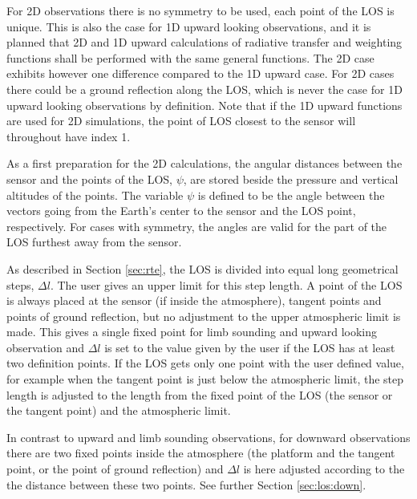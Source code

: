  For 2D observations there is no symmetry to be used, each point of
 the LOS is unique. This is also the case for 1D upward looking
 observations, and it is planned that 2D and 1D upward calculations of
 radiative transfer and weighting functions shall be performed with
 the same general functions.  The 2D case exhibits however one
 difference compared to the 1D upward case. For 2D cases there could
 be a ground reflection along the LOS, which is never the case for 1D
 upward looking observations by definition.  Note that if the 1D
 upward functions are used for 2D simulations, the point of LOS
 closest to the sensor will throughout have index 1.

 As a first preparation for the 2D calculations, the angular distances
 between the sensor and the points of the LOS, $\psi$, are stored
 beside the pressure and vertical altitudes of the points. The
 variable $\psi$ is defined to be the angle between the vectors going
 from the Earth's center to the sensor and the LOS point,
 respectively.  For cases with symmetry, the angles are valid for the
 part of the LOS furthest away from the sensor.
 


 \label{sec:rte:stepl}
 
 As described in Section \ref{sec:rte}, the LOS is divided into equal
 long geometrical steps, $\Delta l$. The user gives an upper limit for
 this step length. A point of the LOS is always placed at the sensor
 (if inside the atmosphere), tangent points and points of ground
 reflection, but no adjustment to the upper atmospheric limit is made.
 This gives a single fixed point for limb sounding and upward looking
 observation and $\Delta l$ is set to the value given by the user if
 the LOS has at least two definition points. If the LOS gets only one
 point with the user defined value, for example when the tangent point
 is just below the atmospheric limit, the step length is adjusted to
 the length from the fixed point of the LOS (the sensor or the tangent 
 point) and the atmospheric limit.
 
 In contrast to upward and limb sounding observations, for downward
 observations there are two fixed points inside the atmosphere (the
 platform and the tangent point, or the point of ground reflection)
 and $\Delta l$ is here adjusted according to the the distance between
 these two points. See further Section \ref{sec:los:down}.



 
